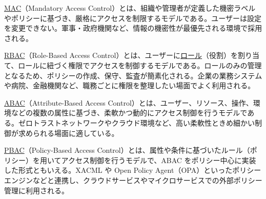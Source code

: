 \documentclass[uplatex]{jsarticle}
\def\label#1{}%
\begin{document}
\begin{dfn}[MAC]\label{dfn:mac}
\underline{MAC}（Mandatory Access Control）とは、組織や管理者が定義した機密ラベルやポリシーに基づき、厳格にアクセスを制限するモデルである。ユーザーは設定を変更できない。軍事・政府機関など、情報の機密性が最優先される環境で採用される。
\end{dfn}

\begin{dfn}[RBAC]\label{dfn:rbac}
\underline{RBAC}（Role-Based Access Control）とは、ユーザーに\underline{ロール}（役割）を割り当て、ロールに紐づく権限でアクセスを制御するモデルである。ロールのみの管理となるため、ポリシーの作成、保守、監査が簡素化される。企業の業務システムや病院、金融機関など、職務ごとに権限を整理したい場面でよく利用される。
\end{dfn}

\begin{dfn}[ABAC]\label{dfn:abac}
\underline{ABAC}（Attribute-Based Access Control）とは、ユーザー、リソース、操作、環境などの複数の属性に基づき、柔軟かつ動的にアクセス制御を行うモデルである。ゼロトラストネットワークやクラウド環境など、高い柔軟性ときめ細かい制御が求められる場面に適している。
\end{dfn}

\begin{dfn}[PBAC]\label{dfn:pbac}
\underline{PBAC}（Policy-Based Access Control）とは、属性や条件に基づいたルール（ポリシー）を用いてアクセス制御を行うモデルで、ABAC をポリシー中心に実装した形式ともいえる。XACML や Open Policy Agent（OPA）といったポリシーエンジンなどと連携し、クラウドサービスやマイクロサービスでの外部ポリシー管理に利用される。
\end{dfn}
\end{document}
